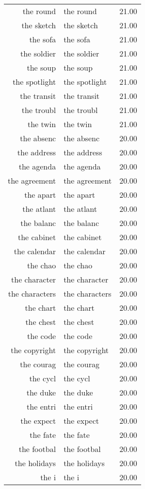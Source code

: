\begin{table}[ht]
\begin{tabular}{rlr}
  the round & the round & 21.00 \\ 
  the sketch & the sketch & 21.00 \\ 
  the sofa & the sofa & 21.00 \\ 
  the soldier & the soldier & 21.00 \\ 
  the soup & the soup & 21.00 \\ 
  the spotlight & the spotlight & 21.00 \\ 
  the transit & the transit & 21.00 \\ 
  the troubl & the troubl & 21.00 \\ 
  the twin & the twin & 21.00 \\ 
  the absenc & the absenc & 20.00 \\ 
  the address & the address & 20.00 \\ 
  the agenda & the agenda & 20.00 \\ 
  the agreement & the agreement & 20.00 \\ 
  the apart & the apart & 20.00 \\ 
  the atlant & the atlant & 20.00 \\ 
  the balanc & the balanc & 20.00 \\ 
  the cabinet & the cabinet & 20.00 \\ 
  the calendar & the calendar & 20.00 \\ 
  the chao & the chao & 20.00 \\ 
  the character & the character & 20.00 \\ 
  the characters & the characters & 20.00 \\ 
  the chart & the chart & 20.00 \\ 
  the chest & the chest & 20.00 \\ 
  the code & the code & 20.00 \\ 
  the copyright & the copyright & 20.00 \\ 
  the courag & the courag & 20.00 \\ 
  the cycl & the cycl & 20.00 \\ 
  the duke & the duke & 20.00 \\ 
  the entri & the entri & 20.00 \\ 
  the expect & the expect & 20.00 \\ 
  the fate & the fate & 20.00 \\ 
  the footbal & the footbal & 20.00 \\ 
  the holidays & the holidays & 20.00 \\ 
  the i & the i & 20.00 \\ 

\end{tabular}
\end{table}
